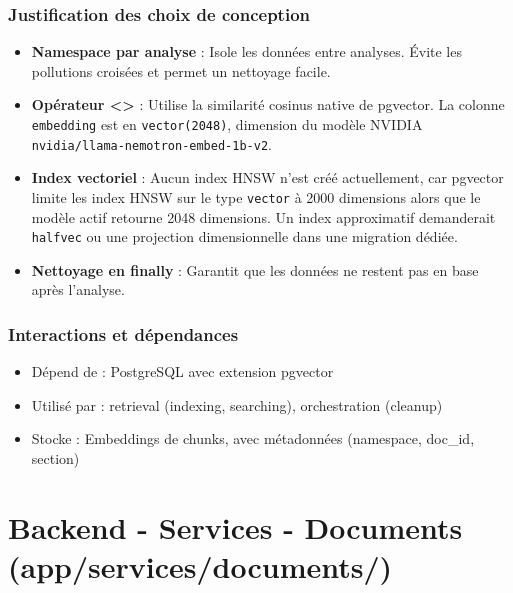 \documentclass[12pt,a4paper,oneside]{book}
\begin{document}
\subsubsection{Justification des choix de conception}

\begin{itemize}
    \item \textbf{Namespace par analyse} : Isole les données entre analyses. Évite les pollutions croisées et permet un nettoyage facile.
    
    \item \textbf{Opérateur <>} : Utilise la similarité cosinus native de pgvector. La colonne \texttt{embedding} est en \texttt{vector(2048)}, dimension du modèle NVIDIA \texttt{nvidia/llama-nemotron-embed-1b-v2}.

    \item \textbf{Index vectoriel} : Aucun index HNSW n'est créé actuellement, car pgvector limite les index HNSW sur le type \texttt{vector} à 2000 dimensions alors que le modèle actif retourne 2048 dimensions. Un index approximatif demanderait \texttt{halfvec} ou une projection dimensionnelle dans une migration dédiée.
    
    \item \textbf{Nettoyage en finally} : Garantit que les données ne restent pas en base après l'analyse.
\end{itemize}

\subsubsection{Interactions et dépendances}

\begin{itemize}
    \item Dépend de : PostgreSQL avec extension pgvector
    \item Utilisé par : retrieval (indexing, searching), orchestration (cleanup)
    \item Stocke : Embeddings de chunks, avec métadonnées (namespace, doc\_id, section)
\end{itemize}

\newpage


\section{Backend - Services - Documents (app/services/documents/)}
\end{document}
